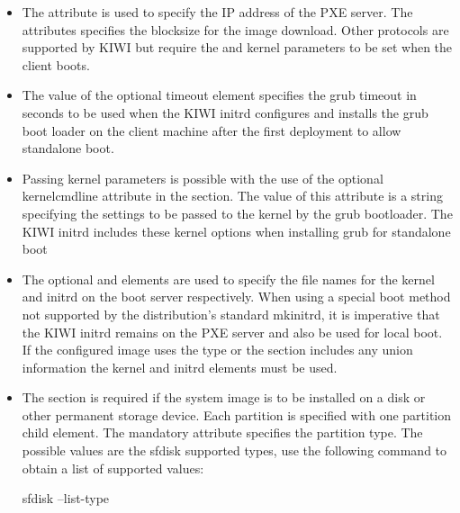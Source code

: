 \begin{itemize}
	\begin {itemize}
	\item The  attribute is used to specify the IP address
      of the PXE server. The  attributes specifies the
      blocksize for the image download. Other protocols are supported by
      KIWI but require the  and 
      kernel parameters to be set when the client boots.
	\item The value of the optional timeout element specifies the grub
      timeout in seconds to be used when the KIWI initrd configures and
      installs the grub boot loader on the client machine after the first
      deployment to allow standalone boot.
	\item Passing kernel parameters is possible with the use of the
      optional kernelcmdline attribute in the  section. The value
      of this attribute is a string specifying the settings to be
      passed to the kernel by the grub bootloader. The KIWI initrd
      includes these kernel options when installing grub for standalone boot
	\item The optional  and  elements are
      used to specify the file names for the kernel and initrd on the boot
      server respectively. When using a special boot method not supported
      by the distribution's standard mkinitrd, it is imperative that the
      KIWI initrd remains on the PXE server and also be used for local boot.
      If the configured image uses the  type or the 
      section includes any union information the kernel and initrd elements
      must be used.
	\item The  section is required if the system image is to be
      installed on a disk or other permanent storage device. Each partition
      is specified with one partition child element. The mandatory
       attribute specifies the partition type. The possible
      values are the sfdisk supported types, use the following command
      to obtain a list of supported values:
      
\begin{Command}{14cm}
sfdisk --list-type
\end{Command}
      

\end{itemize}
\end{itemize}
